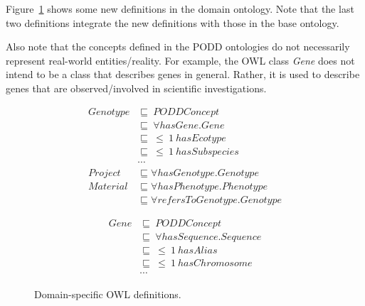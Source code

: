 \documentclass{llncs}
\begin{document}
Figure~\ref{fig:phe_ont} shows some new definitions in the domain
ontology. Note that the last two definitions
integrate the new definitions with those in the base ontology.

Also note that the concepts defined in the PODD ontologies do not
necessarily represent real-world entities/reality. For example, the OWL class
\emph{Gene} does not intend to be a class that describes genes
in general. Rather, it is used to describe genes that are observed/involved
in scientific investigations.

\vspace{-16pt}
{\small
\begin{figure}[htb]
\centering
\begin{minipage}[t]{.55\linewidth}
\centering
\begin{align*}
Genotype &\sqsubseteq~ PODDConcept\label{for:hasPlan}\\
         &\sqsubseteq~ \forall hasGene.Gene\\
         &\sqsubseteq~ \leq~ 1~ hasEcotype\\
         &\sqsubseteq~ \leq~ 1~ hasSubspecies\\
         &\cdots\\
Project  & \sqsubseteq \forall hasGenotype.Genotype\\
Material & \sqsubseteq \forall hasPhenotype.Phenotype\\
         & \sqsubseteq \forall refersToGenotype.Genotype
\end{align*}
\end{minipage}
\begin{minipage}[t]{.4\linewidth}
\centering
\begin{align*}
Gene & \sqsubseteq~ PODDConcept\\
     & \sqsubseteq~ \forall hasSequence.Sequence\\
     & \sqsubseteq~ \leq~ 1~ hasAlias\\
     & \sqsubseteq~ \leq~ 1~ hasChromosome\\
     & \cdots
\end{align*}
\end{minipage}

\vspace{-4pt}
\caption{Domain-specific OWL definitions.}\label{fig:phe_ont}
\end{figure}
}
\end{document}

